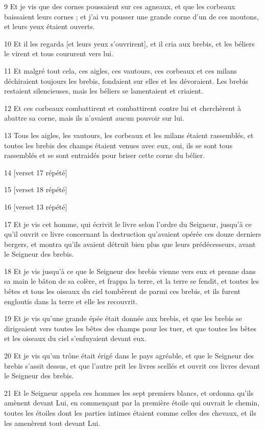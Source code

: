 \par 9 Et je vis que des cornes poussaient sur ces agneaux, et que les corbeaux baissaient leurs cornes ; et j'ai vu pousser une grande corne d'un de ces moutons, et leurs yeux étaient ouverts.
\par 10 Et il les regarda [et leurs yeux s'ouvrirent], et il cria aux brebis, et les béliers le virent et tous coururent vers lui.
\par 11 Et malgré tout cela, ces aigles, ces vautours, ces corbeaux et ces milans déchiraient toujours les brebis, fondaient sur elles et les dévoraient. Les brebis restaient silencieuses, mais les béliers se lamentaient et criaient.
\par 12 Et ces corbeaux combattirent et combattirent contre lui et cherchèrent à abattre sa corne, mais ils n'avaient aucun pouvoir sur lui.
\par 13 Tous les aigles, les vautours, les corbeaux et les milans étaient rassemblés, et toutes les brebis des champs étaient venues avec eux, oui, ils se sont tous rassemblés et se sont entraidés pour briser cette corne du bélier.
\par 14 [verset 17 répété]
\par 15 [verset 18 répété]
\par 16 [verset 13 répété]
\par 17 Et je vis cet homme, qui écrivit le livre selon l'ordre du Seigneur, jusqu'à ce qu'il ouvrit ce livre concernant la destruction qu'avaient opérée ces douze derniers bergers, et montra qu'ils avaient détruit bien plus que leurs prédécesseurs, avant le Seigneur des brebis.
\par 18 Et je vis jusqu'à ce que le Seigneur des brebis vienne vers eux et prenne dans sa main le bâton de sa colère, et frappa la terre, et la terre se fendit, et toutes les bêtes et tous les oiseaux du ciel tombèrent de parmi ces brebis, et ils furent engloutis dans la terre et elle les recouvrit.
\par 19 Et je vis qu'une grande épée était donnée aux brebis, et que les brebis se dirigeaient vers toutes les bêtes des champs pour les tuer, et que toutes les bêtes et les oiseaux du ciel s'enfuyaient devant eux.
\par 20 Et je vis qu'un trône était érigé dans le pays agréable, et que le Seigneur des brebis s'assit dessus, et que l'autre prit les livres scellés et ouvrit ces livres devant le Seigneur des brebis.
\par 21 Et le Seigneur appela ces hommes les sept premiers blancs, et ordonna qu'ils amènent devant Lui, en commençant par la première étoile qui ouvrait le chemin, toutes les étoiles dont les parties intimes étaient comme celles des chevaux, et ils les amenèrent tout devant Lui.
